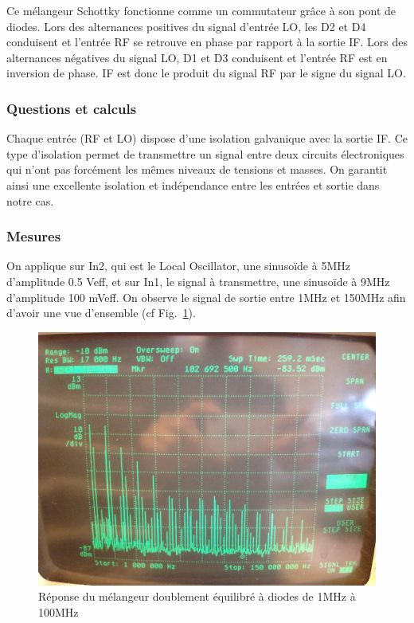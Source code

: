 \documentclass{article}
\begin{document}
Ce mélangeur Schottky fonctionne comme un commutateur grâce à son pont de diodes. Lors des alternances positives du signal d'entrée LO,  les D2 et D4 conduisent  et l'entrée RF se retrouve en phase  par rapport à la sortie IF. Lors des alternances négatives du signal LO, D1 et D3 conduisent et l'entrée RF est en inversion de phase. IF est donc le produit du signal RF par le signe du signal LO.

\subsubsection{Questions et calculs}


Chaque entrée (RF et LO) dispose d'une isolation galvanique avec la sortie IF. Ce type d'isolation permet de transmettre un signal entre deux circuits électroniques qui n'ont pas forcément les mêmes niveaux de tensions et masses. On garantit ainsi une excellente isolation et indépendance entre les entrées et sortie dans notre cas.

\subsubsection{Mesures}


On applique sur In2, qui est le Local Oscillator, une sinusoïde à 5MHz d’amplitude  0.5 Veff, et sur In1, le signal à transmettre, une sinusoïde à 9MHz d'amplitude 100 mVeff.
On observe le signal de sortie entre 1MHz et 150MHz afin d'avoir une vue d'ensemble (cf Fig.~\ref{fig:9_3_1}).

\begin{figure}[h!]
	\centering
	\includegraphics[width=.7\textwidth]{9_3_1}
	\caption{Réponse du mélangeur doublement équilibré à diodes de 1MHz à 100MHz}
	\label{fig:9_3_1}
\end{figure}
\end{document}
